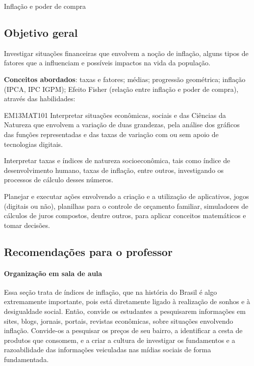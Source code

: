 \begin{paginatexto}{Inflação e poder de compra}
\subsection*{Objetivo geral}
Investigar situações financeiras que envolvem a noção de inflação, alguns tipos de fatores que a influenciam e possíveis impactos na vida da população.

\textbf{Conceitos abordados}: taxas e fatores; médias; progressão geométrica; inflação (IPCA, IPC IGPM); Efeito Fisher (relação entre inflação e poder de compra), através das habilidades:

\begin{habilities}{EM13MAT101}
 Interpretar situações econômicas, sociais e das Ciências da Natureza
que envolvem a variação de duas grandezas, pela análise dos gráficos das funções representadas e das taxas de variação com ou sem apoio de tecnologias digitais.


Interpretar taxas e índices de natureza socioeconômica, tais como índice de desenvolvimento humano, taxas de inflação, entre outros, investigando os processos de cálculo desses números.

Planejar e executar ações envolvendo a criação e a utilização de aplicativos, jogos (digitais ou não), planilhas para o controle de orçamento familiar, simuladores de cálculos de juros compostos, dentre outros, para aplicar conceitos matemáticos e tomar decisões. 

\end{habilities}

\subsection*{Recomendações para o professor}

\paragraph{Organização em sala de aula} Essa seção trata de índices de inflação, que na história do Brasil é algo extremamente importante, pois está diretamente ligado à realização de sonhos e à desigualdade social. Então, convide os estudantes a pesquisarem informações em sites, blogs, jornais, portais, revistas econômicas, sobre situações envolvendo inflação. Convide-os a pesquisar os preços de seu bairro, a identificar a cesta de produtos que consomem, e a criar a cultura de investigar os fundamentos e a razoabilidade das informações veiculadas nas mídias sociais de forma fundamentada.


\end{paginatexto}

